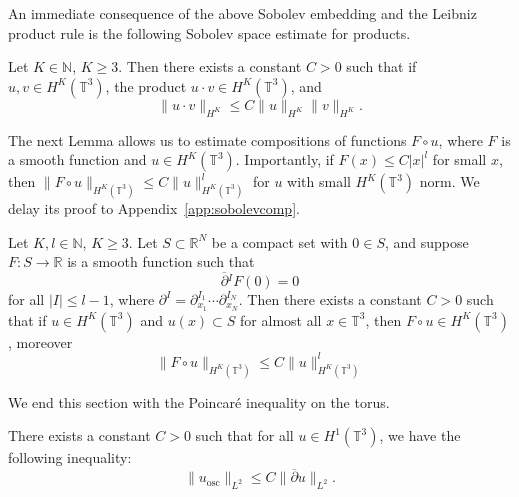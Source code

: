 \documentclass{article}
\newcommand{\RR}{\mathbb{R}}
\newcommand{\NN}{\mathbb{N}}
\newcommand{\TT}{\mathbb{T}}
\newcommand{\osc}{\mathrm{osc}}
\newcommand{\ol}{\overline}
\newcommand{\pa}{\partial}
\newcommand{\ra}{\rightarrow}
\begin{document}
An immediate consequence of the above Sobolev embedding and the Leibniz product rule is the following Sobolev space estimate for products.
\begin{lemma}\label{sec:prelims.lem:sobolevproduct}
    Let $K \in \NN$, $K \geq 3$. Then there exists a constant $C > 0$ such that if $u,v\in H^K(\TT^3)$, the product $u\cdot v \in H^K(\TT^3)$, and
    \begin{equation}\label{sec:prelims.bootbound.eq:sobolevproduct}
        \|u\cdot v\|_{H^K} \leq C\|u\|_{H^K} \|v\|_{H^K}.
    \end{equation}
\end{lemma}

The next Lemma allows us to estimate compositions of functions $F\circ u$, where $F$ is a smooth function and $u \in H^K(\TT^3)$. Importantly, if $F(x) \leq C|x|^l$ for small $x$, then $\|F\circ u\|_{H^K(\TT^3)} \leq C\|u\|_{H^K(\TT^3)}^l$ for $u$ with small $H^K(\TT^3)$ norm. We delay its proof to Appendix~\ref{app:sobolevcomp}.
\begin{lemma}\label{sec:prelims.lem:sobolevcomp}
    Let $K,l \in \NN$, $K \geq 3$. Let $S \subset \RR^N$ be a compact set with $0 \in S$, and suppose $F: S \ra \RR$ is a smooth function such that 
    \begin{equation}
        \ol{\pa}{}^I F(0) = 0
    \end{equation}
    for all $|I| \leq l-1$, where $\pa^I = \pa_{x_1}^{I_1}\cdots \pa_{x_N}^{I_N}$. Then there exists a constant $C > 0$ such that if $u \in H^K(\TT^3)$ and 
    $u(x) \subset S$ for almost all $x \in \TT^3$, then $F \circ u \in H^K(\TT^3)$, moreover
    \begin{equation}\label{sec:prelims.eq:sobolevcomp}
        \|F \circ u\|_{H^K(\TT^3)} \leq C\|u\|_{H^K(\TT^3)}^l
    \end{equation}
\end{lemma}

We end this section with the Poincar\'e inequality on the torus.
\begin{lemma}\label{sec:prelims.lem:poincare}
    There exists a constant $C > 0$ such that for all $u \in H^1(\TT^3)$, we have the following inequality: 
    \begin{equation}\label{sec:avgsys.eq:poincare}
        \|u_{\osc}\|_{L^2} \leq C\|\ol{\pa} u\|_{L^2}.
    \end{equation}
\end{lemma}
\end{document}

